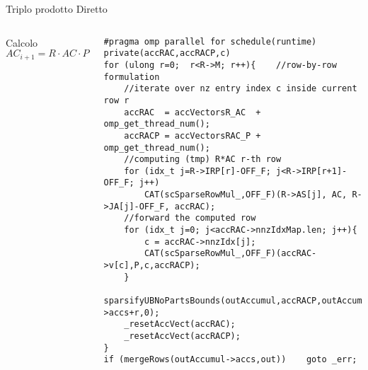 \begin{frame}[fragile]  {Triplo prodotto Diretto}
\begin{columns}
	Calcolo $AC_{i+1} = R \cdot AC \cdot P$
	\begin{lstlisting}
#pragma omp parallel for schedule(runtime) private(accRAC,accRACP,c)
for (ulong r=0;  r<R->M; r++){    //row-by-row formulation
    //iterate over nz entry index c inside current row r
    accRAC  = accVectorsR_AC  + omp_get_thread_num();
    accRACP = accVectorsRAC_P + omp_get_thread_num();
	//computing (tmp) R*AC r-th row
    for (idx_t j=R->IRP[r]-OFF_F; j<R->IRP[r+1]-OFF_F; j++)
        CAT(scSparseRowMul_,OFF_F)(R->AS[j], AC, R->JA[j]-OFF_F, accRAC);
    //forward the computed row
    for (idx_t j=0; j<accRAC->nnzIdxMap.len; j++){
        c = accRAC->nnzIdx[j];    
        CAT(scSparseRowMul_,OFF_F)(accRAC->v[c],P,c,accRACP);
    }
    sparsifyUBNoPartsBounds(outAccumul,accRACP,outAccumul->accs+r,0);
    _resetAccVect(accRAC);
    _resetAccVect(accRACP);
}
if (mergeRows(outAccumul->accs,out))    goto _err;
	\end{lstlisting}
\end{columns}
\end{frame}

